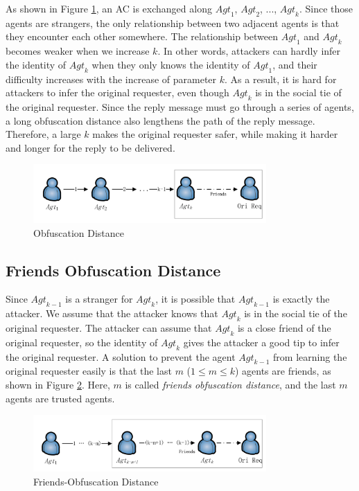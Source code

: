 \documentclass[conference]{IEEEtran}
\begin{document}
As shown in Figure \ref{fig:ObfuscationDistance}, an AC is exchanged along ${Agt}_1$, ${Agt}_2$, ..., ${Agt}_k$. Since those agents are strangers, the only relationship between two adjacent agents is that they encounter each other somewhere. The relationship between ${Agt}_1$ and ${Agt}_k$ becomes weaker when we increase $k$. In other words, attackers can hardly infer the identity of ${Agt}_k$ when they only knows the identity of ${Agt}_1$, and their difficulty increases with the increase of parameter $k$. As a result, it is hard for attackers to infer the original requester, even though ${Agt}_k$ is in the social tie of the original requester. Since the reply message must go through a series of agents, a long obfuscation distance also lengthens the path of the reply message. Therefore, a large $k$ makes the original requester safer, while making it harder and longer for the reply to be delivered.

\begin{figure} [hbtp]
  \centering 
  \includegraphics[width=3.5in]{figures/ACPObfDis.png}
  \caption{Obfuscation Distance} 
  \label{fig:ObfuscationDistance} %
\end{figure}

\subsection{ Friends Obfuscation Distance}

\noindent Since ${Agt}_{k-1}$ is a stranger for ${Agt}_k$, it is possible that ${Agt}_{k-1}$ is exactly the attacker. We assume that the attacker knows that ${Agt}_k$ is in the social tie of the original requester. The attacker can assume that ${Agt}_k$ is a close friend of the original requester, so the identity of ${Agt}_k$ gives the attacker a good tip to infer the original requester. A solution to prevent the agent ${Agt}_{k-1}$ from learning the original requester easily is that the last $m$ ($1\leq m\leq k$) agents are friends, as shown in Figure \ref{fig:FriObfuscationDistance}. Here, $m$ is called \textit{friends obfuscation distance}, and the last $m$ agents are trusted agents.

\begin{figure} [hbtp]
  \centering 
  \includegraphics[width=3.5in]{figures/ACPFriObfDis.png}
  \caption{Friends-Obfuscation Distance} 
  \label{fig:FriObfuscationDistance} %
\end{figure}
\end{document}
